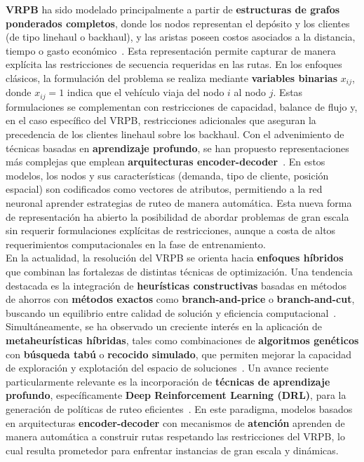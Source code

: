 \documentclass[letter, 10pt]{article}
\begin{document}
\textbf{VRPB} ha sido modelado principalmente a partir de \textbf{estructuras de grafos ponderados completos}, donde los nodos representan el dep\'osito y los clientes (de tipo linehaul o backhaul), y las aristas poseen costos asociados a la distancia, tiempo o gasto econ\'omico~\cite{goetschalckx1989vehicle}. Esta representaci\'on permite capturar de manera expl\'icita las restricciones de secuencia requeridas en las rutas. En los enfoques cl\'asicos, la formulaci\'on del problema se realiza mediante \textbf{variables binarias} \( x_{ij} \), donde \( x_{ij} = 1 \) indica que el veh\'iculo viaja del nodo \( i \) al nodo \( j \). Estas formulaciones se complementan con restricciones de capacidad, balance de flujo y, en el caso espec\'ifico del VRPB, restricciones adicionales que aseguran la precedencia de los clientes linehaul sobre los backhaul. Con el advenimiento de t\'ecnicas basadas en \textbf{aprendizaje profundo}, se han propuesto representaciones m\'as complejas que emplean \textbf{arquitecturas encoder-decoder}~\cite{wang2025deep}. En estos modelos, los nodos y sus caracter\'isticas (demanda, tipo de cliente, posici\'on espacial) son codificados como vectores de atributos, permitiendo a la red neuronal aprender estrategias de ruteo de manera autom\'atica. Esta nueva forma de representaci\'on ha abierto la posibilidad de abordar problemas de gran escala sin requerir formulaciones expl\'icitas de restricciones, aunque a costa de altos requerimientos computacionales en la fase de entrenamiento.\\

En la actualidad, la resoluci\'on del VRPB se orienta hacia \textbf{enfoques h\'ibridos} que combinan las fortalezas de distintas t\'ecnicas de optimizaci\'on. Una tendencia destacada es la integraci\'on de \textbf{heur\'isticas constructivas} basadas en m\'etodos de ahorros con \textbf{m\'etodos exactos} como \textbf{branch-and-price} o \textbf{branch-and-cut}, buscando un equilibrio entre calidad de soluci\'on y eficiencia computacional~\cite{queiroga2020exact}. Simult\'aneamente, se ha observado un creciente inter\'es en la aplicaci\'on de \textbf{metaheur\'isticas h\'ibridas}, tales como combinaciones de \textbf{algoritmos gen\'eticos} con \textbf{b\'usqueda tab\'u} o \textbf{recocido simulado}, que permiten mejorar la capacidad de exploraci\'on y explotaci\'on del espacio de soluciones~\cite{sethanan2020hybrid}. Un avance reciente particularmente relevante es la incorporaci\'on de \textbf{t\'ecnicas de aprendizaje profundo}, espec\'ificamente \textbf{Deep Reinforcement Learning (DRL)}, para la generaci\'on de pol\'iticas de ruteo eficientes~\cite{wang2025deep}. En este paradigma, modelos basados en arquitecturas \textbf{encoder-decoder} con mecanismos de \textbf{atenci\'on} aprenden de manera autom\'atica a construir rutas respetando las restricciones del VRPB, lo cual resulta prometedor para enfrentar instancias de gran escala y din\'amicas.\\
\end{document}

